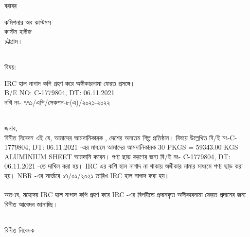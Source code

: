\documentclass[12pt]{article}
\newcommand{\fileno}{নথি নং- ৭৭১/এপি/সেকশন-৮(এ)/২০২১-২০২২}
\newcommand{\beno}{C-1779804}
\newcommand{\bedt}{06.11.2021}
\newcommand{\pkg}{30 PKGS = 59343.00 KGS}
\newcommand{\good}{ALUMINIUM SHEET}
\newcommand{\impn}{\jfcl}
\newcommand{\ircupdate}{১৭/০১/২০২১}
\begin{document}
\fontsize{16pt}{16pt}\selectfont
\noindent
বরাবর
\\
\begin{minipage}[t]{0.06\linewidth}
\hspace{1em}
\end{minipage}
\begin{minipage}[t]{0.94\linewidth}
কমিশনার অব কাস্টমস
\\
কাস্টম হাউজ
\\
চট্টগ্রাম।
\\
\\
\end{minipage}
\begin{minipage}[t]{0.08\linewidth}
বিষয়:
\end{minipage}
\begin{minipage}[t]{0.92\linewidth}
IRC হাল নাগাদ কপি গ্রহণ করে অঙ্গীকারনামা ফেরত প্রসঙ্গে।
\\
B/E NO: {\beno}, DT: {\bedt}
\\
{\fileno}
\\
\\
\end{minipage}
জনাব,
\\
\hspace*{2.7em}
বিনীত নিবেদন এই যে, আমাদের আমদানিকারক {\impn},
দেশের অন্যতম শিল্প প্রতিষ্ঠান।
বিষয়ে উল্লেখিত বি/ই নং-{\beno}, DT: {\bedt} -এর মাধ্যমে
আমাদের আমদানিকারক {\pkg} {\good}
আমদানি করেন। পণ্য ছাড় করণের জন্য
বি/ই নং- {\beno}, DT: {\bedt} -তে দাখিল করা হয়। IRC এর কপি
হাল নাগাদ না থাকায় অঙ্গীকার নামার মাধ্যমে পণ্য ছাড় করা হয়। NBR -এর
সার্ভারে {\ircupdate} তারিখ
IRC হাল নাগাদ করা হয়।
\\
\\
অতএব, মহোদয় IRC হাল নাগাদ কপি গ্রহণ করে
IRC -এর বিপরীতে প্রদানকৃত অঙ্গীকারনামা ফেরত
প্রদানের জন্য বিনীত আবেদন জানাচ্ছি।
\\
\\
\begin{minipage}[t]{0.55\linewidth}
\hspace{0em}
\end{minipage}
\begin{minipage}[t]{0.45\linewidth}
বিনীত নিবেদক
\\
\\
\\
\\
\\
\footnotesize{{\cnfn}}
\end{minipage}
\thispagestyle{laststyle}
\end{document}
